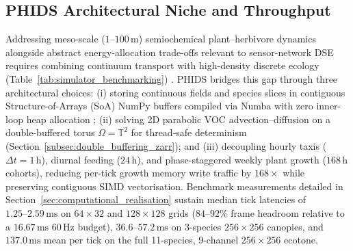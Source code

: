 \subsection{PHIDS Architectural Niche and Throughput}
\label{sec:related_phids_niche}

Addressing meso-scale ($1\text{--}100\,\text{m}$) semiochemical plant--herbivore dynamics alongside abstract energy-allocation trade-offs relevant to sensor-network DSE requires combining continuum transport with high-density discrete ecology (Table~\ref{tab:simulator_benchmarking}) \cite{dietrich2025visual}. PHIDS bridges this gap through three architectural choices: (i) storing continuous fields and species slices in contiguous Structure-of-Arrays (SoA) NumPy buffers compiled via Numba with zero inner-loop heap allocation \cite{harris2020array, lam2015numba}; (ii) solving 2D parabolic VOC advection--diffusion on a double-buffered torus $\Omega = \mathbb{T}^2$ for thread-safe determinism (Section~\ref{subsec:double_buffering_zarr}); and (iii) decoupling hourly taxis ($\Delta t = 1\,\text{h}$), diurnal feeding ($24\,\text{h}$), and phase-staggered weekly plant growth ($168\,\text{h}$ cohorts), reducing per-tick growth memory write traffic by $168\times$ while preserving contiguous SIMD vectorisation. Benchmark measurements detailed in Section~\ref{sec:computational_realisation} sustain median tick latencies of $1.25\text{--}2.59\,\text{ms}$ on $64 \times 32$ and $128 \times 128$ grids ($84\text{--}92\%$ frame headroom relative to a $16.67\,\text{ms}$ $60\,\text{Hz}$ budget), $36.6\text{--}57.2\,\text{ms}$ on 3-species $256 \times 256$ canopies, and $137.0\,\text{ms}$ mean per tick on the full 11-species, 9-channel $256 \times 256$ ecotone.
